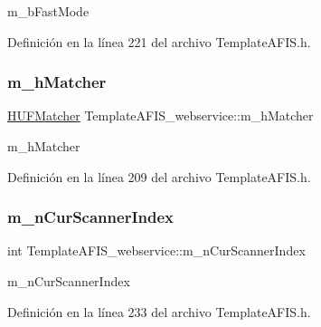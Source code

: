 m\+\_\+b\+Fast\+Mode 



Definición en la línea 221 del archivo Template\+A\+F\+I\+S.\+h.

\hypertarget{classTemplateAFIS__webservice_a9e97e8c2a5aa5de8ee51fbdfe4644c39}{}\label{classTemplateAFIS__webservice_a9e97e8c2a5aa5de8ee51fbdfe4644c39} 
\subsubsection{\texorpdfstring{m\+\_\+h\+Matcher}{m\_hMatcher}}
{\footnotesize\ttfamily \hyperlink{UFMatcher_8h_a2a955bd8ef5ebcf92278a2b037f6e739}{H\+U\+F\+Matcher} Template\+A\+F\+I\+S\+\_\+webservice\+::m\+\_\+h\+Matcher\hspace{0.3cm}{\ttfamily [private]}}



m\+\_\+h\+Matcher 



Definición en la línea 209 del archivo Template\+A\+F\+I\+S.\+h.

\hypertarget{classTemplateAFIS__webservice_a0d609b06768f2c253f43654966bd41e1}{}\label{classTemplateAFIS__webservice_a0d609b06768f2c253f43654966bd41e1} 
\subsubsection{\texorpdfstring{m\+\_\+n\+Cur\+Scanner\+Index}{m\_nCurScannerIndex}}
{\footnotesize\ttfamily int Template\+A\+F\+I\+S\+\_\+webservice\+::m\+\_\+n\+Cur\+Scanner\+Index\hspace{0.3cm}{\ttfamily [private]}}



m\+\_\+n\+Cur\+Scanner\+Index 



Definición en la línea 233 del archivo Template\+A\+F\+I\+S.\+h.

\hypertarget{classTemplateAFIS__webservice_ad979fde0c45dd460249d041a669a9914}{}\label{classTemplateAFIS__webservice_ad979fde0c45dd460249d041a669a9914} 
